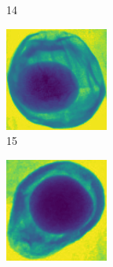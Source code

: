 \documentclass[11pt]{article}
\begin{document}
\begin{figure}[!h]
\begin{subfigure}[b]{0.22\textwidth}
         \caption{14}
         \label{fig:avo_13}
     \end{subfigure}
     \hfill
     \begin{subfigure}[b]{0.22\textwidth}
         \centering
         \includegraphics[width=\textwidth]{figurer/avocado_dataset/avo_14.jpg}
         \caption{15}
         \label{fig:avo_14}
     \end{subfigure}
     \hfill
     \begin{subfigure}[b]{0.22\textwidth}
         \centering
         \includegraphics[width=\textwidth]{figurer/avocado_dataset/avo_15.jpg}

\end{subfigure}
\end{figure}
\end{document}
